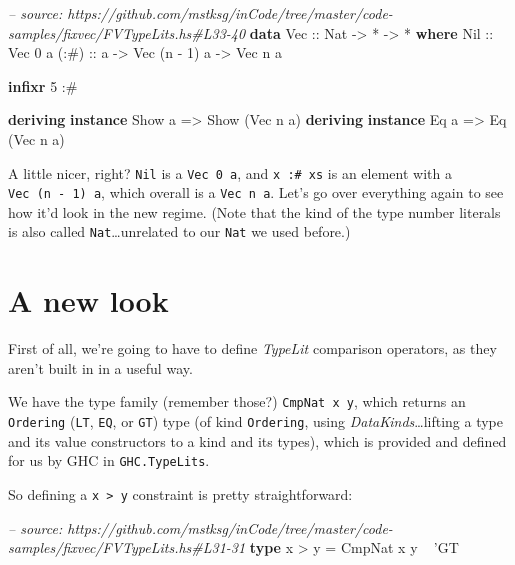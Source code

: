 \documentclass[]{article}
\newenvironment{Shaded}{}{}
\newcommand{\KeywordTok}[1]{\textcolor[rgb]{0.00,0.44,0.13}{\textbf{{#1}}}}
\newcommand{\DataTypeTok}[1]{\textcolor[rgb]{0.56,0.13,0.00}{{#1}}}
\newcommand{\DecValTok}[1]{\textcolor[rgb]{0.25,0.63,0.44}{{#1}}}
\newcommand{\CharTok}[1]{\textcolor[rgb]{0.25,0.44,0.63}{{#1}}}
\newcommand{\CommentTok}[1]{\textcolor[rgb]{0.38,0.63,0.69}{\textit{{#1}}}}
\newcommand{\OtherTok}[1]{\textcolor[rgb]{0.00,0.44,0.13}{{#1}}}
\newcommand{\FunctionTok}[1]{\textcolor[rgb]{0.02,0.16,0.49}{{#1}}}
\newcommand{\NormalTok}[1]{{#1}}
\begin{document}
\begin{Shaded}
\begin{Highlighting}[]
\CommentTok{-- source: https://github.com/mstksg/inCode/tree/master/code-samples/fixvec/FVTypeLits.hs#L33-40}
\KeywordTok{data} \DataTypeTok{Vec}\OtherTok{ ::} \DataTypeTok{Nat} \OtherTok{->} \FunctionTok{*} \OtherTok{->} \FunctionTok{*} \KeywordTok{where}
    \DataTypeTok{Nil}\OtherTok{  ::} \DataTypeTok{Vec} \DecValTok{0} \NormalTok{a}
\OtherTok{    (:#) ::} \NormalTok{a }\OtherTok{->} \DataTypeTok{Vec} \NormalTok{(n }\FunctionTok{-} \DecValTok{1}\NormalTok{) a }\OtherTok{->} \DataTypeTok{Vec} \NormalTok{n a}

\KeywordTok{infixr} \DecValTok{5} \FunctionTok{:#}

\KeywordTok{deriving} \KeywordTok{instance} \DataTypeTok{Show} \NormalTok{a }\OtherTok{=>} \DataTypeTok{Show} \NormalTok{(}\DataTypeTok{Vec} \NormalTok{n a)}
\KeywordTok{deriving} \KeywordTok{instance} \DataTypeTok{Eq} \NormalTok{a }\OtherTok{=>} \DataTypeTok{Eq} \NormalTok{(}\DataTypeTok{Vec} \NormalTok{n a)}
\end{Highlighting}
\end{Shaded}

A little nicer, right? \texttt{Nil} is a \texttt{Vec\ 0\ a}, and
\texttt{x\ :\#\ xs} is an element with a \texttt{Vec\ (n\ -\ 1)\ a},
which overall is a \texttt{Vec\ n\ a}. Let's go over everything again to
see how it'd look in the new regime. (Note that the kind of the type
number literals is also called \texttt{Nat}\ldots{}unrelated to our
\texttt{Nat} we used before.)

\section{A new look}\label{a-new-look}

First of all, we're going to have to define \emph{TypeLit} comparison
operators, as they aren't built in in a useful way.

We have the type family (remember those?) \texttt{CmpNat\ x\ y}, which
returns an \texttt{Ordering} (\texttt{LT}, \texttt{EQ}, or \texttt{GT})
type (of kind \texttt{Ordering}, using \emph{DataKinds}\ldots{}lifting a
type and its value constructors to a kind and its types), which is
provided and defined for us by GHC in \texttt{GHC.TypeLits}.

So defining a \texttt{x\ \textgreater{}\ y} constraint is pretty
straightforward:

\begin{Shaded}
\begin{Highlighting}[]
\CommentTok{-- source: https://github.com/mstksg/inCode/tree/master/code-samples/fixvec/FVTypeLits.hs#L31-31}
\KeywordTok{type} \NormalTok{x }\FunctionTok{>} \NormalTok{y }\FunctionTok{=} \DataTypeTok{CmpNat} \NormalTok{x y }\FunctionTok{~} \CharTok{'GT}
\end{Highlighting}
\end{Shaded}
\end{document}
